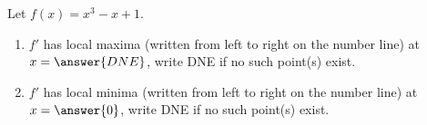 \documentclass{ximera}
\author{Gregory Hartman \and Matthew Carr}
\begin{document}
\begin{exercise}






Let $f(x)=x^3-x+1$.
\begin{enumerate}
\item		$f'$ has local maxima (written from left to right on the number line) at $x=\answer{DNE}$, write DNE if no such point(s) exist.
\item		$f'$ has local minima (written from left to right on the number line) at $x=\answer{0}$, write DNE if no such point(s) exist.
\end{enumerate}

\end{exercise}
\end{document}
